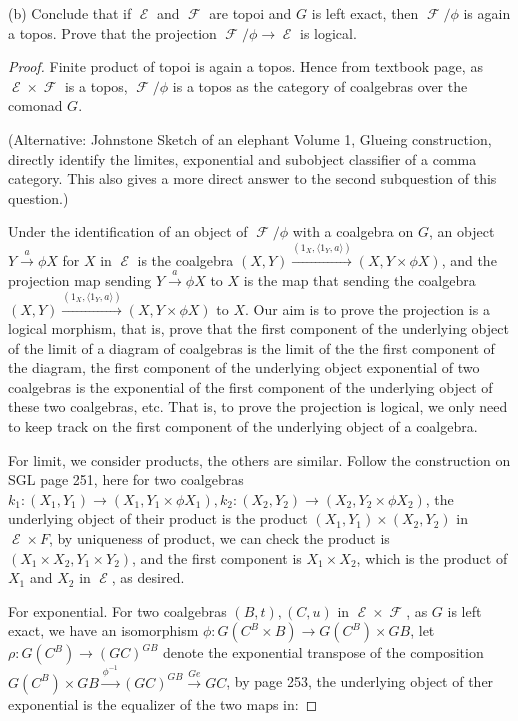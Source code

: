 \documentclass[a4paper]{article}
\DeclareMathOperator{\E}{\mathcal E}
\DeclareMathOperator{\F}{\mathcal F}
\begin{document}
(b) Conclude that if $\E$ and $\F$ are topoi and $G$ is left exact, then $\F/\phi$ is again a topos. Prove that the projection $\F/\phi\to \E$ is logical.
\begin{proof}
    Finite product of topoi is again a topos. Hence from textbook page, as $\E\times \F$ is a topos, $\F/\phi$ is a topos as the category of coalgebras over the comonad $G$.

    (Alternative: Johnstone Sketch of an elephant Volume 1, Glueing construction, directly identify the limites, exponential and subobject classifier of a comma category. This also gives a more direct answer to the second subquestion of this question.)

    Under the identification of an object of $\F/\phi$ with a coalgebra on $G$, an object $Y\overset{a}\to \phi X$ for $X$ in $\E$ is the coalgebra $(X,Y)\overset{(1_X,\langle 1_Y,a\rangle)}\to (X,Y\times \phi X)$, and the projection map sending $Y\overset{a}\to \phi X$ to $X$ is the map that sending the coalgebra  $(X,Y)\overset{(1_X,\langle 1_Y,a\rangle)}\to (X,Y\times \phi X)$ to $X$. Our aim is to prove the projection is a logical morphism, that is, prove that the first component of the underlying object of the limit of a diagram of coalgebras is the limit of the the first component of the diagram, the first component of the underlying object exponential of two coalgebras is the exponential of the first component of the underlying object of these two coalgebras, etc. That is, to prove the projection is logical, we only need to keep track on the first component of the underlying object of a coalgebra.

    For limit, we consider products, the others are similar. Follow the construction on SGL page 251, here for two coalgebras $k_1:(X_1,Y_1)\to (X_1,Y_1\times \phi X_1),k_2:(X_2,Y_2)\to (X_2,Y_2\times \phi X_2)$, the underlying object of their product is the product $(X_1,Y_1)\times (X_2,Y_2)$ in $\E\times F$, by uniqueness of product, we can check the product is $(X_1\times X_2,Y_1\times Y_2)$, and the first component is $X_1\times X_2$, which is the product of $X_1$ and $X_2$ in $\E$, as desired.

    For exponential. For two coalgebras $(B,t),(C,u)$ in $\E\times \F$, as $G$ is left exact, we have an isomorphism $\phi:G(C^B\times B)\to G(C^B)\times GB$, let $\rho:G(C^B)\to (GC)^{GB}$ denote the exponential transpose of the composition $G(C^B)\times GB\overset{\phi^{-1}}\to (GC)^{GB}\overset{Ge}\to GC$, by page 253, the underlying object of ther exponential is the equalizer of the two maps in:


\end{proof}
\end{document}
